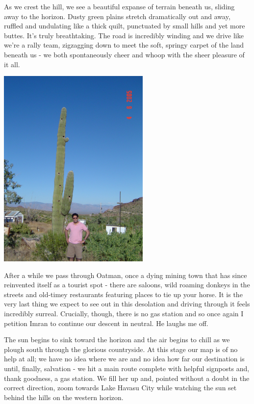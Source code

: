 \documentclass[a5paper,titlepage,11pt]{book}
\begin{document}
As we crest the hill, we see a beautiful expanse of terrain beneath us, sliding away to the horizon. Dusty green plains stretch dramatically out and away, ruffled and undulating like a thick quilt, punctuated by small hills and yet more buttes. It's truly breathtaking. The road is incredibly winding and we drive like we're a rally team, zigzagging down to meet the soft, springy carpet of the land beneath us - we both spontaneously cheer and whoop with the sheer pleasure of it all.

\begin{center}\includegraphics[height=100mm]{gfx/DSC00701}\end{center}

After a while we pass through Oatman, once a dying mining town that has since reinvented itself as a tourist spot - there are saloons, wild roaming donkeys in the streets and old-timey restaurants featuring places to tie up your horse. It is the very last thing we expect to see out in this desolation and driving through it feels incredibly surreal. Crucially, though, there is no gas station and so once again I petition Imran to continue our descent in neutral. He laughs me off.

The sun begins to sink toward the horizon and the air begins to chill as we plough south through the glorious countryside. At this stage our map is of no help at all; we have no idea where we are and no idea how far our destination is until, finally, salvation - we hit a main route complete with helpful signposts and, thank goodness, a gas station. We fill her up and, pointed without a doubt in the correct direction, zoom towards Lake Havasu City while watching the sun set behind the hills on the western horizon.
\end{document}

